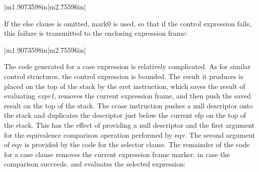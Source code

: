 \begin{center}
\tablelasttail{\hline}
\begin{xtabular}{|m{1.9073598in}|m{2.75596in}|}

\end{xtabular}
\end{center}

If the else clause is omitted, mark0 is used, so that if the control
expression fails, this failure is transmitted to the enclosing
expression frame:

\begin{center}
\tablelasttail{\hline}
\begin{xtabular}{|m{1.9073598in}|m{2.75596in}|}

\end{xtabular}
\end{center}

The code generated for a case expression is relatively complicated. As
for similar control structures, the control expression is bounded. The
result it produces is placed on the top of the stack by the eret
instruction, which saves the result of evaluating \textit{expr1},
removes the current expression frame, and then push the saved result
on the top of the stack. The ccase instruction pushes a null
descriptor onto the stack and duplicates the descriptor just below the
current efp on the top of the stack. This has the effect of providing
a null descriptor and the first argument for the equivalence
comparison operation performed by eqv. The second argument of eqv is
provided by the code for the selector clause. The remainder of the
code for a case clause removes the current expression frame marker. in
case the comparison succeeds. and evaluates the selected expression:

